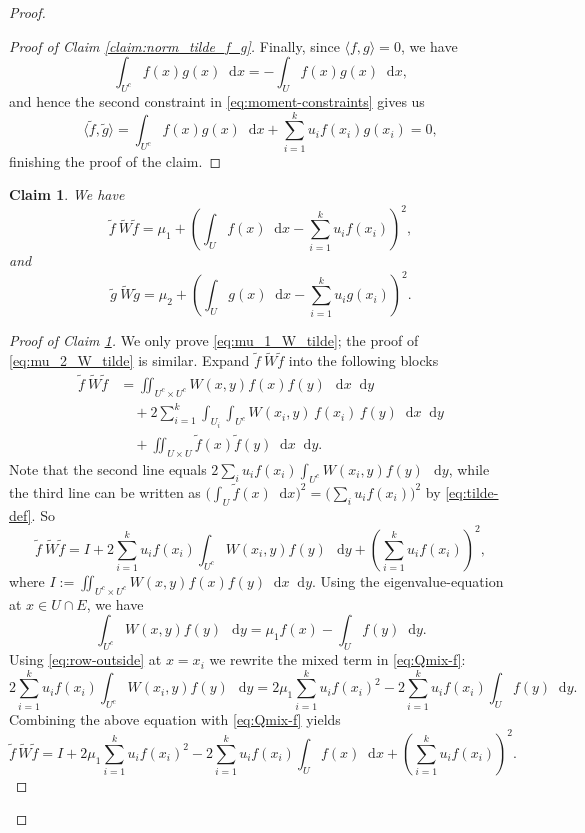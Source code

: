\documentclass[10pt,a4paper]{amsart}
\newtheorem{claim}{Claim}
\newcommand{\dif}{\mathop{}\!\mathrm{d}}
\begin{document}
\begin{proof}
\begin{proof}[Proof of Claim \ref{claim:norm_tilde_f_g}]
Finally, since $\langle f,g\rangle=0$, we have 
\[
\int_{U^c} f(x)g(x) \dif{x} = -\int_U f(x)g(x) \dif{x},
\]
and hence the second constraint in \eqref{eq:moment-constraints} gives us
\[
\langle \tilde f,\tilde g\rangle
= \int_{U^c} f(x)g(x) \dif{x} + \sum_{i=1}^k u_i f(x_i)g(x_i)=0,
\]
finishing the proof of the claim.
\end{proof}

\begin{claim}\label{claim:tilde_fWf}
We have
\begin{equation}\label{eq:mu_1_W_tilde}
\tilde f\ \widetilde{W}\tilde f = \mu_1+\left(\int_U f(x) \dif{x} -\sum_{i=1}^k u_i f(x_i)\right)^2,
\end{equation}
and 
\begin{equation}\label{eq:mu_2_W_tilde}
\tilde g\ \widetilde{W}\tilde g 
=\mu_2+\left(\int_U g(x) \dif x -\sum_{i=1}^k u_i g(x_i)\right)^2.
\end{equation}
\end{claim}

\begin{proof}[Proof of Claim \ref{claim:tilde_fWf}]
We only prove \eqref{eq:mu_1_W_tilde}; the proof of \eqref{eq:mu_2_W_tilde} is similar. 
Expand $\tilde f\ \widetilde{W}\tilde f$ into the following blocks
\begin{align*}
\tilde f\ \widetilde{W}\tilde f
& =\iint_{U^c\times U^c} W(x,y)f(x)f(y)\,\dif{x} \dif{y} \\
& \quad + 2\sum_{i=1}^k \int_{U_i}\int_{U^c} W(x_i,y)\, f(x_i)\, f(y) \dif{x} \dif{y} \\
& \quad + \iint_{U\times U} \tilde f(x)\tilde f(y) \dif{x} \dif{y}.
\end{align*}
Note that the second line equals $2\sum_i u_i f(x_i)\int_{U^c} W(x_i,y)f(y)\,\dif y$, while the third line can be written as
$\big(\int_U \tilde f(x) \dif x \big)^2 = \big(\sum_i u_i f(x_i)\big)^2$ by \eqref{eq:tilde-def}. So
\begin{equation}\label{eq:Qmix-f}
\tilde f\ \widetilde{W}\tilde f
= I+2\sum_{i=1}^k u_i f(x_i)\int_{U^c} W(x_i,y)f(y)\,\dif{y} + \left(\sum_{i=1}^k u_i f(x_i)\right)^2,
\end{equation}
where $I:=\iint_{U^c\times U^c} W(x,y) f(x) f(y) \dif{x} \dif{y}$. Using the 
eigenvalue-equation at $x\in U\cap E$, we have 
\begin{equation}\label{eq:row-outside}
\int_{U^c} W(x,y)f(y)\,\dif{y} = \mu_1 f(x)-\int_U f(y) \dif{y}.
\end{equation}
Using \eqref{eq:row-outside} at $x=x_i$ we rewrite the mixed term in \eqref{eq:Qmix-f}:
\[
2\sum_{i=1}^k u_i f(x_i) \int_{U^c}W(x_i,y)f(y)\,\dif{y} 
= 2\mu_1\sum_{i=1}^k u_i f(x_i)^2 - 2\sum_{i=1}^k u_i f(x_i)\int_U f(y) \dif{y}. 
\]
Combining the above equation with \eqref{eq:Qmix-f} yields
\begin{equation}\label{eq:Qmix-f-2}
\tilde f\, \widetilde{W}\tilde f
= I + 2\mu_1\sum_{i=1}^k u_i f(x_i)^2-2\sum_{i=1}^k u_i f(x_i)\int_U f(x)\dif{x}+\left(\sum_{i=1}^k u_i f(x_i)\right)^2.
\end{equation}


\end{proof}
\end{proof}
\end{document}
